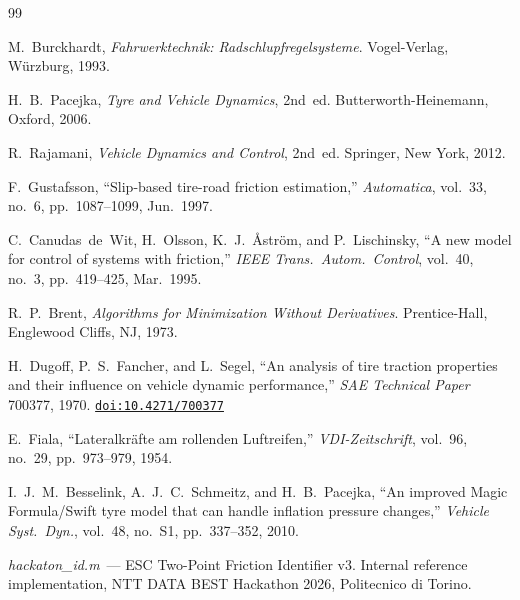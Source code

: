 \documentclass[11pt,a4paper]{article}
\newcommand{\doi}[1]{\href{https://doi.org/#1}{\texttt{doi:#1}}}
\begin{document}
\begin{thebibliography}{99}

M.~Burckhardt,
\textit{Fahrwerktechnik: Radschlupfregelsysteme}.
Vogel-Verlag, W\"{u}rzburg, 1993.

H.~B.~Pacejka,
\textit{Tyre and Vehicle Dynamics}, 2nd~ed.
Butterworth-Heinemann, Oxford, 2006.

R.~Rajamani,
\textit{Vehicle Dynamics and Control}, 2nd~ed.
Springer, New York, 2012.

F.~Gustafsson,
``Slip-based tire-road friction estimation,''
\textit{Automatica}, vol.~33, no.~6, pp.~1087--1099, Jun.~1997.

C.~Canudas~de~Wit, H.~Olsson, K.~J.~\AA{}str\"{o}m, and P.~Lischinsky,
``A new model for control of systems with friction,''
\textit{IEEE Trans.\ Autom.\ Control}, vol.~40, no.~3, pp.~419--425, Mar.~1995.

R.~P.~Brent,
\textit{Algorithms for Minimization Without Derivatives}.
Prentice-Hall, Englewood Cliffs, NJ, 1973.

H.~Dugoff, P.~S.~Fancher, and L.~Segel,
``An analysis of tire traction properties and their influence on vehicle
dynamic performance,''
\textit{SAE Technical Paper} 700377, 1970.
\newblock \doi{10.4271/700377}

E.~Fiala,
``Lateralkr\"{a}fte am rollenden Luftreifen,''
\textit{VDI-Zeitschrift}, vol.~96, no.~29, pp.~973--979, 1954.

I.~J.~M.~Besselink, A.~J.~C.~Schmeitz, and H.~B.~Pacejka,
``An improved {Magic Formula/Swift} tyre model that can handle inflation
pressure changes,''
\textit{Vehicle Syst.\ Dyn.}, vol.~48, no.~S1, pp.~337--352, 2010.

\textit{hackaton\_id.m}~--- {ESC} Two-Point Friction Identifier v3.
Internal reference implementation, NTT DATA BEST Hackathon 2026,
Politecnico di Torino.

\end{thebibliography}
\end{document}
